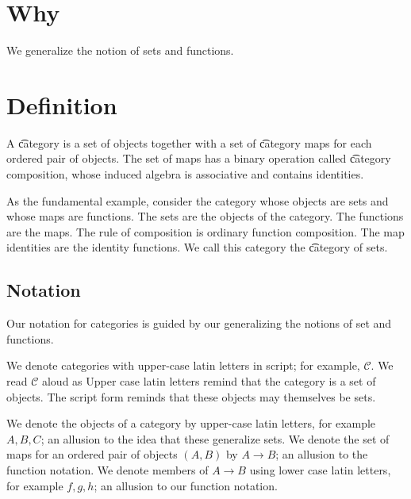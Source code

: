 

\section*{Why}

We generalize the notion of sets and functions.

\section*{Definition}

A \t{category} is a set of
objects together with a set of
\t{category maps} for each
ordered pair of objects.
The set of maps has a binary operation called
\t{category composition},
whose induced algebra is associative and contains identities.

As the fundamental example, consider the category whose
objects are sets and whose maps are functions.
The sets are the objects of the category.
The functions are the maps.
The rule of composition is ordinary function composition.
The map identities are the identity functions.
We call this category the \t{category of sets}.

\subsection*{Notation}

Our notation for categories is guided by our generalizing the notions of set and functions.

We denote categories with upper-case latin letters
in script; for example, $\mathcal{C} $.
We read $\mathcal{C} $ aloud as 
Upper case latin letters remind that the category is a set of objects.
The script form reminds that these objects may themselves be sets.

We denote the objects of a category by upper-case latin letters,
for example $A, B, C$; an allusion to the idea that these generalize sets.
We denote the set of maps for an ordered pair of objects $(A, B)$
by $A \to B$; an allusion to the function notation.
We denote members of $A \to B$ using lower case latin letters,
for example $f, g, h$; an allusion to our function notation.
